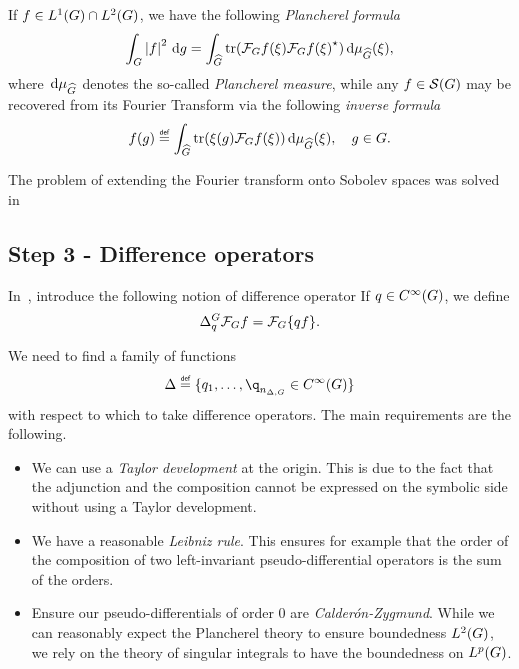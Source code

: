 If $f \in \Lebesgue 1 \Group \cap \Lebesgue 2 \Group$,
we have the following \emph{Plancherel formula}
\begin{align*}
    \int_\Group \abs f^2 \dd g
    = \int_{\dualGroup \Group}
    \tr(\Fourier f(\xi) \adj{\Fourier f(\xi)})
    \dd \mu_{\dualGroup \Group}(\xi),
\end{align*}
where $\dd \mu_{\dualGroup \Group}$ denotes the so-called \emph{Plancherel measure},
while any $f \in \Schwartz \Group$ may be recovered from its Fourier Transform via
the following \emph{inverse formula}
\begin{align*}
    f(g) \defeq
    \int_{\dualGroup \Group}
    \tr(\xi(g) \Fourier f(\xi))
    \dd \mu_{\dualGroup \Group}(\xi),
    \quad g \in \Group.
\end{align*}

The problem of extending the Fourier transform onto Sobolev spaces was solved in~\cite[Subsection 5.1.1]{FischerRuzhansky16}

\subsection*{Step 3 - Difference operators}

In~\cite{RuzhanskyTurunen10},
\citeauthor{RuzhanskyTurunen10} introduce the following notion of difference operator
If $q \in \SmoothFunctions \Group$,
we define
\begin{align*}
    \DifferenceOperator [\Group] q \Fourier f = \Fourier \{q f\}.
\end{align*}

We need to find a family of functions
\begin{align*}
    \Delta \defeq \{q_1, \dots, \q_{\dimDifferenceOperators} \in \SmoothFunctions \Group\}
\end{align*}
with respect to which to take difference operators.
The main requirements are the following.
\begin{itemize}
    \item We can use a \emph{Taylor development} at the origin.
        This is due to the fact that the adjunction and the composition cannot be expressed on the symbolic side without using a Taylor development.
    \item We have a reasonable \emph{Leibniz rule}.
        This ensures for example that the order of the composition of two left-invariant pseudo-differential operators is the sum of the orders.
    \item Ensure our pseudo-differentials of order $0$ are \emph{Calder\'on-Zygmund}.
        While we can reasonably expect the Plancherel theory to ensure boundedness $\Lebesgue 2 \Group$,
        we rely on the theory of singular integrals to have the boundedness on $\Lebesgue p \Group$.
\end{itemize}

